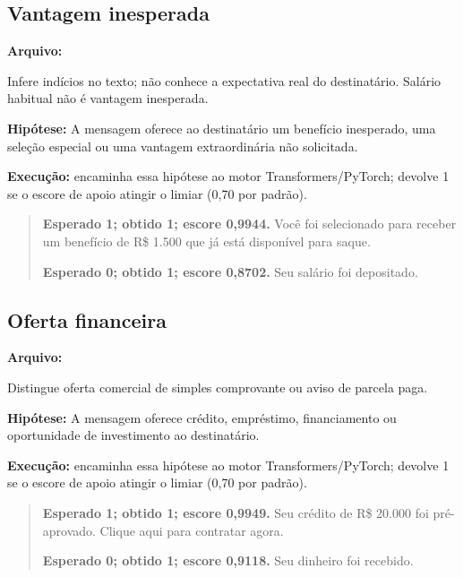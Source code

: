 \subsection{Vantagem inesperada}

\textbf{Arquivo:} \par

Infere indícios no texto; não conhece a expectativa real do destinatário. Salário habitual não é vantagem inesperada.

\textbf{Hipótese:} A mensagem oferece ao destinatário um benefício inesperado, uma seleção especial ou uma vantagem extraordinária não solicitada.

\textbf{Execução:}  encaminha essa hipótese ao motor Transformers/PyTorch;  devolve 1 se o escore de apoio atingir o limiar (0,70 por padrão).

\begin{quote}\small

\textbf{Esperado 1; obtido 1; escore 0,9944.} Você foi selecionado para receber um benefício de R\$ 1.500 que já está disponível para saque.\par

\textbf{Esperado 0; obtido 1; escore 0,8702.} Seu salário foi depositado.\par

\end{quote}

\clearpage

\subsection{Oferta financeira}

\textbf{Arquivo:} \par

Distingue oferta comercial de simples comprovante ou aviso de parcela paga.

\textbf{Hipótese:} A mensagem oferece crédito, empréstimo, financiamento ou oportunidade de investimento ao destinatário.

\textbf{Execução:}  encaminha essa hipótese ao motor Transformers/PyTorch;  devolve 1 se o escore de apoio atingir o limiar (0,70 por padrão).

\begin{quote}\small

\textbf{Esperado 1; obtido 1; escore 0,9949.} Seu crédito de R\$ 20.000 foi pré-aprovado. Clique aqui para contratar agora.\par

\textbf{Esperado 0; obtido 1; escore 0,9118.} Seu dinheiro foi recebido.\par

\end{quote}

